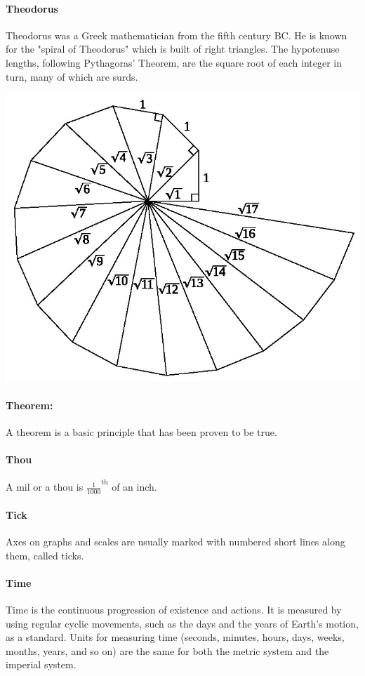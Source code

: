 \documentclass[12pt]{article}
\begin{document}
\paragraph{Theodorus}
Theodorus was a Greek mathematician from the fifth century BC. He is known for the "spiral of Theodorus" which is built of right triangles. The hypotenuse lengths, following Pythagoras' Theorem, are the square root of each integer in turn, many of which are surds.
\begin{center}
\includegraphics[width=\linewidth]{Spiral_of_Theodorus.jpg}
\end{center}

\paragraph{Theorem:} A theorem is a basic principle that has been proven to be true.

\paragraph{Thou}
A mil or a thou is $\frac{1}{1000}^{\textrm{th}}$ of an inch.

\paragraph{Tick}
Axes on graphs and scales are usually marked with numbered short lines along them, called ticks.

\paragraph{Time}
Time is the continuous progression of existence and actions. It is measured by using regular cyclic movements, such as the days and the years of Earth's motion, as a standard. Units for measuring time (seconds, minutes, hours, days, weeks, months, years, and so on) are the same for both the metric system and the imperial system.
\end{document}
